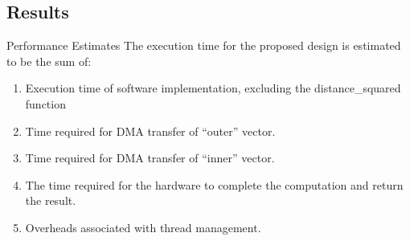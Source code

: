\subsection{Results}
\begin{frame}{Performance Estimates}
    The execution time for the proposed design is estimated to be the sum of:
    \begin{enumerate}[<+->]
        \item Execution time of software implementation, excluding the
            distance\_squared function
        \item Time required for DMA transfer of ``outer'' vector.
        \item Time required for DMA transfer of ``inner'' vector.
        \item The time required for the hardware to complete the computation and
            return the result.
        \item Overheads associated with thread management.
    \end{enumerate}
\end{frame}

